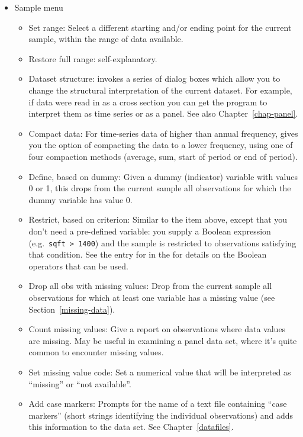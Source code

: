 \begin{itemize}
\item \textsf{Sample menu}
  \begin{itemize}
  \item \textsf{Set range}: Select a different starting and/or ending
    point for the current sample, within the range of data available.
  \item \textsf{Restore full range}: self-explanatory.
  \item \textsf{Dataset structure}: invokes a series of dialog boxes
    which allow you to change the structural interpretation of the
    current dataset.  For example, if data were read in as a cross
    section you can get the program to interpret them as time series
    or as a panel.  See also Chapter~\ref{chap-panel}.
  \item \textsf{Compact data}: For time-series data of higher than
    annual frequency, gives you the option of compacting the data to a
    lower frequency, using one of four compaction methods (average,
    sum, start of period or end of period).
  \item \textsf{Define, based on dummy}: Given a dummy (indicator)
    variable with values 0 or 1, this drops from the current sample
    all observations for which the dummy variable has value 0.
  \item \textsf{Restrict, based on criterion}: Similar to the item
    above, except that you don't need a pre-defined variable: you
    supply a Boolean expression (e.g.\ \verb+sqft > 1400+) and the
    sample is restricted to observations satisfying that condition.
    See the entry for  in the \GCR
    for details on the Boolean operators that can be used.
  \item \textsf{Drop all obs with missing values}: Drop from the
    current sample all observations for which at least one variable
    has a missing value (see Section~\ref{missing-data}).
  \item \textsf{Count missing values}: Give a report on observations
    where data values are missing. May be useful in examining a panel
    data set, where it's quite common to encounter missing values.
  \item \textsf{Set missing value code}: Set a numerical value that
    will be interpreted as ``missing'' or ``not available''.
  \item \textsf{Add case markers}: Prompts for the name of a text file
    containing ``case markers'' (short strings identifying the
    individual observations) and adds this information to the data
    set. See Chapter~\ref{datafiles}.

\end{itemize}
\end{itemize}
